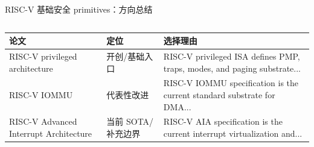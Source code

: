 \begin{frame}[t,shrink=6]{RISC-V 基础安全 primitives：方向总结}
\begin{columns}[T,totalwidth=\textwidth]
\begin{column}{0.49\textwidth}
{  \begin{minipage}[t]{0.97\linewidth}
    \vspace{1.1mm}
    \hspace{1.4mm}\begin{minipage}{0.92\linewidth}
      \scriptsize {\tiny
\begin{tabularx}{\linewidth}{@{}YYY@{}}
\toprule
\textbf{论文} & \textbf{定位} & \textbf{选择理由} \\
\midrule
RISC-V privileged architecture & 开创/基础入口 & RISC-V privileged ISA defines PMP, traps, modes, and paging substrate... \\
RISC-V IOMMU & 代表性改进 & RISC-V IOMMU specification is the current standard substrate for DMA... \\
RISC-V Advanced Interrupt Architecture & 当前 SOTA/补充边界 & RISC-V AIA specification is the current interrupt virtualization and... \\
\bottomrule
\end{tabularx}
}
    \end{minipage}
    \vspace{1mm}
  \end{minipage}}
  \end{column}
\end{columns}
\end{frame}
